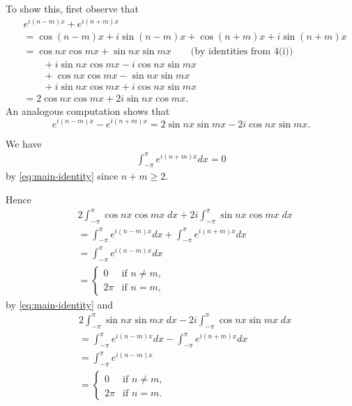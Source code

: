 \documentclass[oneside]{article}
\begin{document}
\begin{enumerate}[label=\textbf{\arabic*.}]
  To show this, first observe that \begin{align*}
    &e^{i(n-m)x} + e^{i(n+m)x} \\
    &= \cos(n-m)x + i\sin(n-m)x + \cos(n+m)x + i\sin(n+m)x \\
    &= \cos nx \cos mx + \sin nx \sin mx \qquad\text{(by identities from 4(i))} \\
    &\qquad+i\sin nx \cos mx - i\cos nx \sin mx \\
    &\qquad+\cos nx \cos mx - \sin nx \sin mx \\
    &\qquad+i\sin nx \cos mx + i\cos nx \sin mx  \\
    &= 2\cos nx \cos mx + 2i\sin nx \cos mx \text{.}
  \end{align*} An analogous computation shows that \[
    e^{i(n-m)x} - e^{i(n+m)x} = 2\sin nx \sin mx - 2i\cos nx \sin mx \text{.}
  \]

  We have \begin{align*}
    \int_{-\pi}^{\pi}{e^{i(n+m)x}}dx = 0
  \end{align*} by \eqref{eq:main-identity} since $n + m \geq 2$.

  Hence \begin{align*}
    & 2\int_{-\pi}^\pi\cos nx \cos mx\;dx + 2i\int_{-\pi}^\pi\sin nx \cos mx\;dx \\
    &= \int_{-\pi}^\pi e^{i(n-m)x} dx + \int_{-\pi}^\pi e^{i(n+m)x} dx \\
    &= \int_{-\pi}^\pi e^{i(n-m)x} dx \\
    &= \begin{cases}
      0 & \text{if }n \neq m \text{,} \\
      2\pi & \text{if }n = m \text{,}
    \end{cases}
  \end{align*} by \eqref{eq:main-identity} and \begin{align*}
    & 2\int_{-\pi}^\pi\sin nx \sin mx\;dx - 2i\int_{-\pi}^\pi\cos nx \sin mx\;dx \\
    &= \int_{-\pi}^\pi e^{i(n-m)x} dx - \int_{-\pi}^\pi e^{i(n+m)x} dx \\
    &= \int_{-\pi}^\pi e^{i(n-m)x} \\
    &= \begin{cases}
      0 & \text{if }n \neq m \text{,} \\
      2\pi & \text{if }n = m \text{.}
    \end{cases}
  \end{align*}


\end{enumerate}
\end{document}
